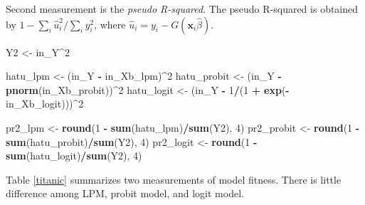 \documentclass[
  12pt,
]{article}
\newenvironment{Shaded}{\begin{snugshade}}{\end{snugshade}}
\newcommand{\DecValTok}[1]{\textcolor[rgb]{0.00,0.00,0.81}{#1}}
\newcommand{\KeywordTok}[1]{\textcolor[rgb]{0.13,0.29,0.53}{\textbf{#1}}}
\newcommand{\NormalTok}[1]{#1}
\newcommand{\OperatorTok}[1]{\textcolor[rgb]{0.81,0.36,0.00}{\textbf{#1}}}
\newcommand{\StringTok}[1]{\textcolor[rgb]{0.31,0.60,0.02}{#1}}
\begin{document}
Second measurement is the \emph{pseudo R-squared}. The pseudo R-squared
is obtained by \(1 - \sum_i \hat{u}_i^2/ \sum_i y_i^2\), where
\(\hat{u}_i = y_i - G(\mathbf{x}_i \hat{\beta})\).

\begin{Shaded}
\begin{Highlighting}[]
\NormalTok{Y2 \textless{}{-}}\StringTok{ }\NormalTok{in\_Y}\OperatorTok{\^{}}\DecValTok{2}

\NormalTok{hatu\_lpm \textless{}{-}}\StringTok{ }\NormalTok{(in\_Y }\OperatorTok{{-}}\StringTok{ }\NormalTok{in\_Xb\_lpm)}\OperatorTok{\^{}}\DecValTok{2}
\NormalTok{hatu\_probit \textless{}{-}}\StringTok{ }\NormalTok{(in\_Y }\OperatorTok{{-}}\StringTok{ }\KeywordTok{pnorm}\NormalTok{(in\_Xb\_probit))}\OperatorTok{\^{}}\DecValTok{2}
\NormalTok{hatu\_logit \textless{}{-}}\StringTok{ }\NormalTok{(in\_Y }\OperatorTok{{-}}\StringTok{ }\DecValTok{1}\OperatorTok{/}\NormalTok{(}\DecValTok{1} \OperatorTok{+}\StringTok{ }\KeywordTok{exp}\NormalTok{(}\OperatorTok{{-}}\NormalTok{in\_Xb\_logit)))}\OperatorTok{\^{}}\DecValTok{2}

\NormalTok{pr2\_lpm \textless{}{-}}\StringTok{ }\KeywordTok{round}\NormalTok{(}\DecValTok{1} \OperatorTok{{-}}\StringTok{ }\KeywordTok{sum}\NormalTok{(hatu\_lpm)}\OperatorTok{/}\KeywordTok{sum}\NormalTok{(Y2), }\DecValTok{4}\NormalTok{)}
\NormalTok{pr2\_probit \textless{}{-}}\StringTok{ }\KeywordTok{round}\NormalTok{(}\DecValTok{1} \OperatorTok{{-}}\StringTok{ }\KeywordTok{sum}\NormalTok{(hatu\_probit)}\OperatorTok{/}\KeywordTok{sum}\NormalTok{(Y2), }\DecValTok{4}\NormalTok{)}
\NormalTok{pr2\_logit \textless{}{-}}\StringTok{ }\KeywordTok{round}\NormalTok{(}\DecValTok{1} \OperatorTok{{-}}\StringTok{ }\KeywordTok{sum}\NormalTok{(hatu\_logit)}\OperatorTok{/}\KeywordTok{sum}\NormalTok{(Y2), }\DecValTok{4}\NormalTok{)}
\end{Highlighting}
\end{Shaded}

Table \ref{titanic} summarizes two measurements of model fitness. There
is little difference among LPM, probit model, and logit model.
\end{document}

